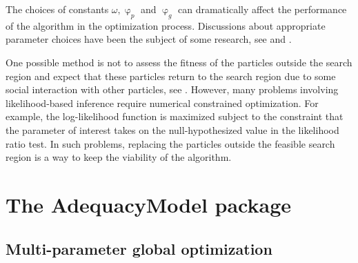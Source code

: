 \documentclass[10pt,letterpaper]{article}
\begin{document}
The choices of constants $\omega, \upvarphi_p$ and $\upvarphi_g$ can dramatically affect the performance of the algorithm in the optimization process.
Discussions about appropriate parameter choices have been the subject of some research, see \cite{kennedyetal2001} and \cite{bratton2008simplified}.

One possible method is not to assess the fitness of the particles outside the search region
and expect that these particles return to the search region due to some social interaction with other particles, see  \cite{brattonkennedy2007}.
However, many problems involving likelihood-based inference require numerical constrained optimization.
For example, the log-likelihood function is maximized subject to the constraint that the parameter of interest takes on the null-hypothesized value in the likelihood ratio test.
In such problems, replacing the particles outside the feasible search region is a way to keep the viability of the algorithm.


\section{The AdequacyModel package}

\subsection{Multi-parameter global optimization}
\end{document}
